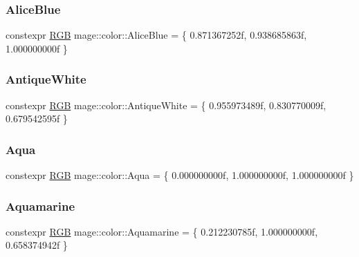 \subsubsection{\texorpdfstring{Alice\+Blue}{AliceBlue}}
{\footnotesize\ttfamily constexpr \mbox{\hyperlink{structmage_1_1_r_g_b}{R\+GB}} mage\+::color\+::\+Alice\+Blue = \{ 0.\+871367252f, 0.\+938685863f, 1.\+000000000f \}}

\mbox{\label{namespacemage_1_1color_a66ba58abef7d938d58b25b45ebfec98f}} 
\subsubsection{\texorpdfstring{Antique\+White}{AntiqueWhite}}
{\footnotesize\ttfamily constexpr \mbox{\hyperlink{structmage_1_1_r_g_b}{R\+GB}} mage\+::color\+::\+Antique\+White = \{ 0.\+955973489f, 0.\+830770009f, 0.\+679542595f \}}

\mbox{\label{namespacemage_1_1color_a1c3b68d6209b49526a3ba6d27f4958d9}} 
\subsubsection{\texorpdfstring{Aqua}{Aqua}}
{\footnotesize\ttfamily constexpr \mbox{\hyperlink{structmage_1_1_r_g_b}{R\+GB}} mage\+::color\+::\+Aqua = \{ 0.\+000000000f, 1.\+000000000f, 1.\+000000000f \}}

\mbox{\label{namespacemage_1_1color_aeb7c11e0c59678c6ddcc4e8379c5a951}} 
\subsubsection{\texorpdfstring{Aquamarine}{Aquamarine}}
{\footnotesize\ttfamily constexpr \mbox{\hyperlink{structmage_1_1_r_g_b}{R\+GB}} mage\+::color\+::\+Aquamarine = \{ 0.\+212230785f, 1.\+000000000f, 0.\+658374942f \}}

\mbox{\label{namespacemage_1_1color_a002c51cadb3b21c6a0c3492303207ee3}} 
